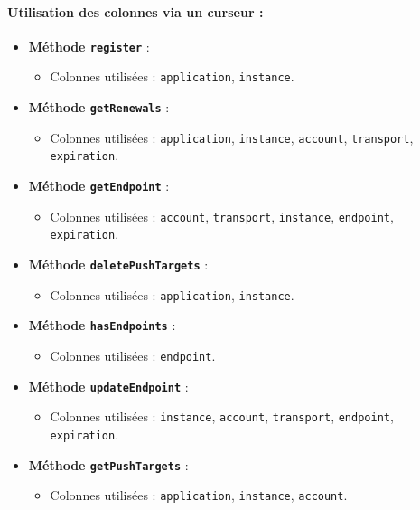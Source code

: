 \documentclass[a4paper,11pt]{article}
\begin{document}
\paragraph{Utilisation des colonnes via un curseur :}
\begin{itemize}
    \item \textbf{Méthode \texttt{register}} :
    \begin{itemize}
        \item Colonnes utilisées : \texttt{application}, \texttt{instance}.
    \end{itemize}
    \item \textbf{Méthode \texttt{getRenewals}} :
    \begin{itemize}
        \item Colonnes utilisées : \texttt{application}, \texttt{instance}, \texttt{account}, \texttt{transport}, \texttt{expiration}.
    \end{itemize}
    \item \textbf{Méthode \texttt{getEndpoint}} :
    \begin{itemize}
        \item Colonnes utilisées : \texttt{account}, \texttt{transport}, \texttt{instance}, \texttt{endpoint}, \texttt{expiration}.
    \end{itemize}
    \item \textbf{Méthode \texttt{deletePushTargets}} :
    \begin{itemize}
        \item Colonnes utilisées : \texttt{application}, \texttt{instance}.
    \end{itemize}
    \item \textbf{Méthode \texttt{hasEndpoints}} :
    \begin{itemize}
        \item Colonnes utilisées : \texttt{endpoint}.
    \end{itemize}
    \item \textbf{Méthode \texttt{updateEndpoint}} :
    \begin{itemize}
        \item Colonnes utilisées : \texttt{instance}, \texttt{account}, \texttt{transport}, \texttt{endpoint}, \texttt{expiration}.
    \end{itemize}
    \item \textbf{Méthode \texttt{getPushTargets}} :
    \begin{itemize}
        \item Colonnes utilisées : \texttt{application}, \texttt{instance}, \texttt{account}.

\end{itemize}
\end{itemize}
\end{document}
